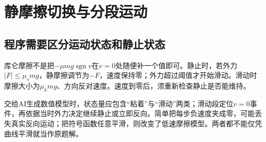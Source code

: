 \section{静摩擦切换与分段运动}
\subsection{程序需要区分运动状态和静止状态}
库仑摩擦不是把$-\mu mg\operatorname{sgn}v$在$v=0$处随便补一个值即可。静止时，若外力$|F|\leq\mu_smg$，静摩擦调节为$-F$，速度保持零；外力超过阈值才开始滑动。滑动时摩擦大小为$\mu_kmg$、方向反对速度。速度到零后，须重新检查静止是否能维持。

交给AI生成数值模型时，状态量应包含“粘着”与“滑动”两类；滑动段定位$v=0$事件，再依据当时外力决定继续静止或立即反向。简单把每步负速度夹成零，可能丢失真实反向运动；把符号函数任意平滑，则改变了低速摩擦模型。两者都不能仅凭曲线平滑就当作原题解。

